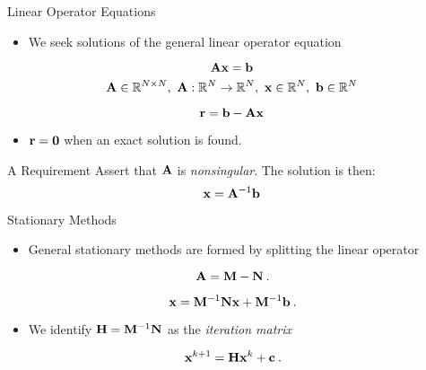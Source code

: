 \documentclass{beamer}
\begin{document}
\begin{frame}{Linear Operator Equations}

  \begin{itemize}
  \item We seek solutions of the general linear operator equation
  \end{itemize}

  \[
  \mathbf{A} \mathbf{x} = \mathbf{b}\:
  \]
  \[
  \mathbf{A} \in \mathbb{R}^{N \times N},\ \mathbf{A} : \mathbb{R}^{N}
  \rightarrow \mathbb{R}^{N},\ \mathbf{x} \in \mathbb{R}^N,\ \mathbf{b} \in
  \mathbb{R}^N\:
  \]


  \[
  \mathbf{r} = \mathbf{b} - \mathbf{A}\mathbf{x}\:
  \]

  \begin{itemize}
  \item $\mathbf{r}=\mathbf{0}$ when an exact solution is found.
  \end{itemize}

  \pause
  \begin{beamerboxesrounded}[upper=boxheadcolor,lower=boxbodycolor,shadow=true]
    {A Requirement}
    Assert that $\mathbf{A}$ is \textit{nonsingular}. The solution is then:
    \[
    \mathbf{x} = \mathbf{A}^{-1}\mathbf{b}\:
    \]
  \end{beamerboxesrounded}

\end{frame}

\begin{frame}{Stationary Methods}

  \begin{itemize}
  \item General stationary methods are formed by splitting the linear
    operator
  \end{itemize}

  \[
  \mathbf{A} = \mathbf{M} - \mathbf{N}\:.
  \]

  \[
  \mathbf{x} = \mathbf{M}^{-1}\mathbf{N}\mathbf{x} + \mathbf{M}^{-1}\mathbf{b}\:.
  \]

  \begin{itemize}
  \item We identify $\mathbf{H} =\mathbf{M}^{-1}\mathbf{N}$ as the
    \textit{iteration matrix}
  \end{itemize}

  \[
  \mathbf{x}^{k+1} = \mathbf{H}\mathbf{x}^{k} + \mathbf{c}\:.
  \]

\end{frame}
\end{document}
